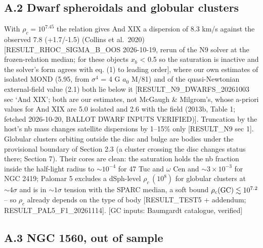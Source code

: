 \documentclass[
  10pt,
]{article}
\begin{document}
\subsection{A.2 Dwarf spheroidals and globular clusters}\label{dwarf-spheroidals-and-globular-clusters}

With $\rho_c=10^{7.45}$ the relation gives And XIX a dispersion of 8.3 km/s
against the observed 7.8 (+1.7/-1.5) (Collins et al.~2020)
{[}RESULT\_RHOC\_SIGMA\_B\_OOS 2026-10-19, rerun of the N9 solver at the
frozen-relation median; for these objects $x_b$ \textless{} 0.5 so the
saturation is inactive and the solver's form agrees with eq. (1) to
leading order{]}, where our own estimates of isolated MOND (5.95, from
$\sigma^4$ = 4 G $a_0$ M/81) and of the quasi-Newtonian external-field
value (2.1) both lie below it {[}RESULT\_N9\_DWARFS\_20261003 sec `And XIX';
both are our estimates, not McGaugh \& Milgrom's, whose a-priori values
for And XIX are 5.0 isolated and 2.6 with the field (2013b,
Table 1; fetched 2026-10-20, BALLOT DWARF INPUTS VERIFIED){]}.
Truncation by the host's nb mass changes satellite dispersions by 1--15\%
only {[}RESULT\_N9 sec 1{]}. Globular clusters orbiting outside the disc and bulge are bodies under the provisional boundary of Section 2.3 (a cluster crossing the disc changes status there; Section 7). Their cores are clean: the
saturation holds the nb fraction inside the half-light radius to
$\sim10^{-4}$ for 47 Tuc and $\omega$ Cen and $\sim3\times10^{-3}$ for
NGC 2419; Palomar 5 excludes a dSph-level $\rho_c\,(10^{8})$ for globular clusters
at $\sim4\sigma$ and is in $\sim1\sigma$ tension with the SPARC median, a soft bound $\rho_c({\rm GC})\lesssim 10^{7.2}$ --
so $\rho_c$ already depends on the type of body {[}RESULT\_TEST5 +
addendum; RESULT\_PAL5\_F1\_20261114{]}. {[}GC inputs: Baumgardt catalogue, verified{]}

\subsection{A.3 NGC 1560, out of sample}
\end{document}
